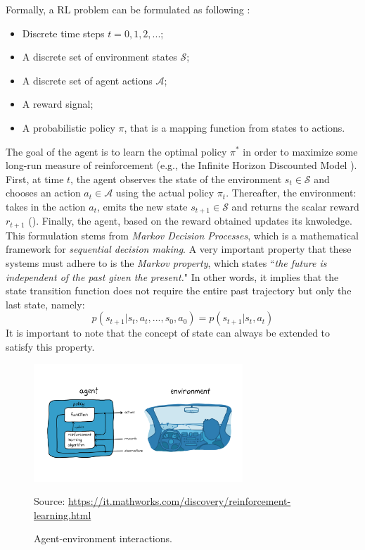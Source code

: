 \documentclass[12pt,a4paper,openright,twoside]{book}
\newcommand{\fonte}[1]{{\color{gray} \small \hypersetup{citecolor=gray} Source: #1}}
\begin{document}
Formally, a RL problem can be formulated as following \cite{RLSurvey}:
    \begin{itemize}
        \item Discrete time steps $t=0, 1, 2, ...$;
        \item A discrete set of environment states $\mathcal{S}$;
        \item A discrete set of agent actions $\mathcal{A}$;
        \item A reward signal;
        \item A probabilistic policy $\pi$, that is a mapping function from states to actions.
    \end{itemize}
    The goal of the agent is to learn the optimal policy $\pi^*$ in order to maximize 
        some long-run measure of reinforcement (e.g., the Infinite Horizon Discounted Model \cite{RLSurvey}).
        First, at time $t$, the agent observes the state of the environment $s_t \in \mathcal{S}$
        and chooses an action $a_t \in \mathcal{A}$ using the actual policy $\pi_t$. 
        Thereafter, the environment: takes in the action $a_t$, emits the new state $s_{t+1} \in \mathcal{S}$ 
        and returns the scalar reward $r_{t+1}$ ().
        Finally, the agent, based on the reward obtained updates its knwoledge.
    This formulation stems from \emph{Markov Decision Processes}, which is a mathematical framework for \emph{sequential decision making}. A very important property that these systems must adhere to is the \emph{Markov property}, which states ``\emph{the future is independent of the past given the present.}" In other words, it implies that the state transition function does not require the entire past trajectory but only the last state, namely: 
    $$p(s_{t+1} | s_t, a_t, ..., s_0, a_0) = p(s_{t+1} | s_t, a_t)$$
    It is important to note that the concept of state can always be extended to satisfy this property.


\begin{figure}[t]
    \centering
    \includegraphics[width=0.7\textwidth]{figures/rl.png}
    \caption{Agent-environment interactions.}
    \fonte{\url{https://it.mathworks.com/discovery/reinforcement-learning.html}}
    \label{fig:rl_schema}
\end{figure}
\end{document}
